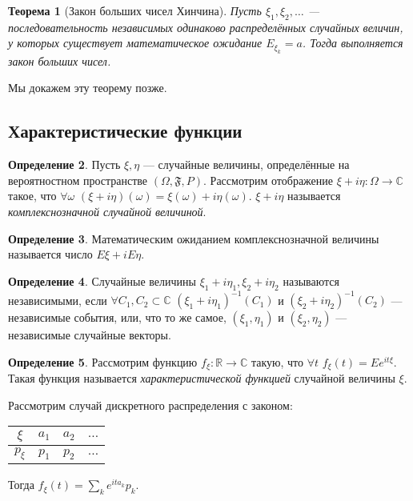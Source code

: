 \documentclass[11pt,openany,a4paper]{scrartcl}
\theoremstyle{plain}
\newtheorem{theorem}{Теорема}[subsection]
\theoremstyle{definition}
\newtheorem{definition}[theorem]{Определение}
\newcommand\mb{\mathbb}
\newcommand\real{\mb R}
\newcommand{\complex}{\mb C}
\begin{document}
\begin{theorem}[Закон больших чисел Хинчина]\label{hinchins_lln}
    Пусть $\xi_1, \xi_2,\ldots$ — последовательность независимых одинаково
    распределённых случайных величин, у которых существует математическое ожидание
    $E_{\xi_k} = a$. Тогда выполняется закон больших чисел.
\end{theorem}

Мы докажем эту теорему позже.

\subsection{Характеристические функции}

\begin{definition}
    Пусть $\xi, \eta$ — случайные величины, определённые на вероятностном
    пространстве $(\Omega, \mathfrak F, P)$. Рассмотрим отображение
    $\xi + i\eta: \Omega \to \complex$ такое, что $\forall \omega$
    $(\xi + i\eta)(\omega) = \xi(\omega) + i\eta(\omega)$. $\xi + i\eta$ 
    называется \emph{комплекснозначной случайной величиной}.
\end{definition}
\begin{definition}
    Математическим ожиданием комплекснозначной величины называется число
    $E\xi + iE\eta$.
\end{definition}
\begin{definition}
    Случайные величины $\xi_1 + i\eta_1, \xi_2 + i\eta_2$ называются независимыми,
    если $\forall C_1, C_2 \subset \complex$ $(\xi_1 + i\eta_1)^{-1}(C_1)$ и
    $(\xi_2 + i\eta_2)^{-1}(C_2)$ — независимые события, или, что то же самое,
    $(\xi_1, \eta_1)$ и $(\xi_2, \eta_2)$ — независимые случайные векторы.
\end{definition}
\begin{definition}
    Рассмотрим функцию $f_\xi: \real \to \complex$ такую, что
    $\forall t$ $f_\xi(t) = Ee^{it\xi}$. Такая функция называется
    \emph{характеристической функцией} случайной величины $\xi$.
\end{definition}

Рассмотрим случай дискретного распределения с законом:
\begin{center}
    \begin{tabular}{| c | c | c | c |}
        \hline
        $\xi$ & $a_1$ & $a_2$ & $\ldots$ \\ \hline
        $p_\xi$ & $p_1$ & $p_2$ & $\ldots$ \\ \hline
    \end{tabular}
\end{center}
Тогда $f_\xi(t) = \sum\limits_k e^{ita_k}p_k$.
\end{document}
